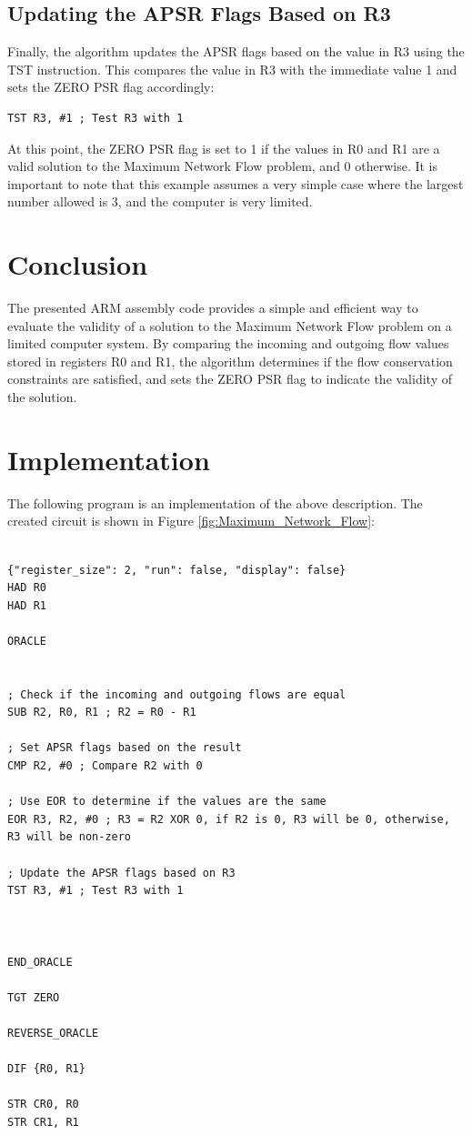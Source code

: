 \subsection{Updating the APSR Flags Based on R3}

Finally, the algorithm updates the APSR flags based on the value in R3 using the TST instruction. This compares the value in R3 with the immediate value 1 and sets the ZERO PSR flag accordingly:

\begin{verbatim}
TST R3, #1 ; Test R3 with 1
\end{verbatim}

At this point, the ZERO PSR flag is set to 1 if the values in R0 and R1 are a valid solution to the Maximum Network Flow problem, and 0 otherwise. It is important to note that this example assumes a very simple case where the largest number allowed is 3, and the computer is very limited.

\section{Conclusion}

The presented ARM assembly code provides a simple and efficient way to evaluate the validity of a solution to the Maximum Network Flow problem on a limited computer system. By comparing the incoming and outgoing flow values stored in registers R0 and R1, the algorithm determines if the flow conservation constraints are satisfied, and sets the ZERO PSR flag to indicate the validity of the solution.



\section{Implementation}

The following program is an implementation of the above description. The created circuit is shown in Figure \ref{fig:Maximum_Network_Flow}:

\begin{lstlisting}

{"register_size": 2, "run": false, "display": false}
HAD R0
HAD R1

ORACLE


; Check if the incoming and outgoing flows are equal
SUB R2, R0, R1 ; R2 = R0 - R1

; Set APSR flags based on the result
CMP R2, #0 ; Compare R2 with 0

; Use EOR to determine if the values are the same
EOR R3, R2, #0 ; R3 = R2 XOR 0, if R2 is 0, R3 will be 0, otherwise, R3 will be non-zero

; Update the APSR flags based on R3
TST R3, #1 ; Test R3 with 1



END_ORACLE

TGT ZERO

REVERSE_ORACLE

DIF {R0, R1}

STR CR0, R0
STR CR1, R1


\end{lstlisting}

